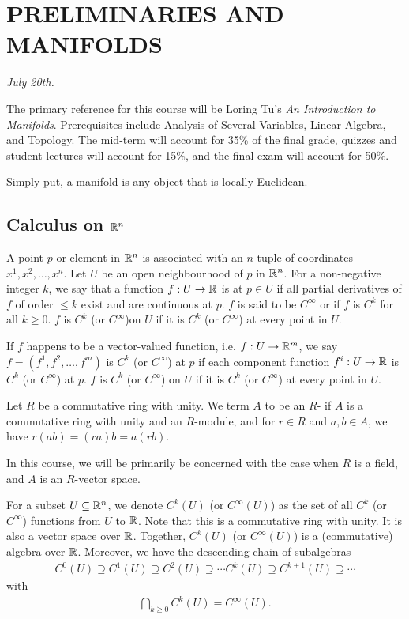 \chapter{PRELIMINARIES AND MANIFOLDS}

\textit{July 20th.}

The primary reference for this course will be Loring Tu's \emph{An Introduction to Manifolds}. Prerequisites include Analysis of Several Variables, Linear Algebra, and Topology. The mid-term will account for 35\% of the final grade, quizzes and student lectures will account for 15\%, and the final exam will account for 50\%. 

Simply put, a manifold is any object that is locally Euclidean.

\section{Calculus on $\mathbb{R}^{n}$}
A point $p$ or element in $\mathbb{R}^{n}$ is associated with an $n$-tuple of coordinates $x^{1},x^{2},\ldots,x^{n}$. Let $U$ be an open neighbourhood of $p$ in $\mathbb{R}^{n}$. For a non-negative integer $k$, we say that a function $f:U\to\mathbb{R}$ is  at $p \in U$ if all partial derivatives of $f$ of order $\leq k$ exist and are continuous at $p$. $f$ is said to be $C^{\infty}$ or  if $f$ is $C^{k}$ for all $k \geq 0$. $f$ is $C^{k}$ (or $C^{\infty}$)on $U$ if it is $C^{k}$ (or $C^{\infty}$) at every point in $U$.

If $f$ happens to be a vector-valued function, i.e. $f:U\to\mathbb{R}^{m}$, we say $f = (f^{1},f^{2},\ldots,f^{m})$ is $C^{k}$ (or $C^{\infty}$) at $p$ if each component function $f^{i}:U\to\mathbb{R}$ is $C^{k}$ (or $C^{\infty}$) at $p$. $f$ is $C^{k}$ (or $C^{\infty}$) on $U$ if it is $C^{k}$ (or $C^{\infty}$) at every point in $U$.

\begin{definition}
    Let $R$ be a commutative ring with unity. We term $A$ to be an $R$- if $A$ is a commutative ring with unity and an $R$-module, and for $r \in R$ and $a,b \in A$, we have $r(ab) = (ra)b = a(rb)$.
\end{definition}
In this course, we will be primarily be concerned with the case when $R$ is a field, and $A$ is an $R$-vector space.

For a subset $U \subseteq \mathbb{R}^{n}$, we denote $C^{k}(U)$ (or $C^{\infty}(U)$) as the set of all $C^{k}$ (or $C^{\infty}$) functions from $U$ to $\mathbb{R}$. Note that this is a commutative ring with unity. It is also a vector space over $\mathbb{R}$. Together, $C^{k}(U)$ (or $C^{\infty}(U)$) is a (commutative) algebra over $\mathbb{R}$. Moreover, we have the descending chain of subalgebras
\begin{align}
    C^{0}(U) \supseteq C^{1}(U) \supseteq C^{2}(U) \supseteq \cdots C^{k}(U) \supseteq C^{k+1}(U) \supseteq \cdots
\end{align}
with
\begin{align}
    \bigcap_{k \geq 0} C^{k}(U) = C^{\infty}(U).
\end{align}

